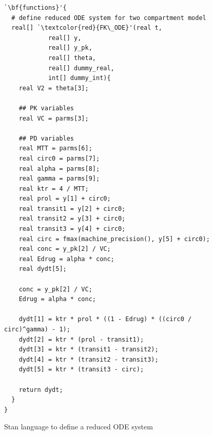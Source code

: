 \documentclass[11pt]{amsart}
\newenvironment{fmpage}[1]
     {\begin{lrbox}{\fmbox}\begin{minipage}{#1}}
     {\end{minipage}\end{lrbox}\fbox{\usebox{\fmbox}}}
\begin{document}
\begin{figure}
\caption{Stan language to define a reduced ODE system}
\begin{center}
\begin{small}
\begin{fmpage}{\textwidth - .75in}
\begin{lstlisting}[basicstyle=\footnotesize\ttfamily,mathescape=true,flexiblecolumns=true,frame=single,escapeinside=`']
`\bf{functions}'{
  # define reduced ODE system for two compartment model
  real[] `\textcolor{red}{FK\_ODE}'(real t,
		    real[] y,
		    real[] y_pk,
		    real[] theta,
		    real[] dummy_real,
		    int[] dummy_int){
    real V2 = theta[3];

    ## PK variables
    real VC = parms[3];

    ## PD variables
    real MTT = parms[6];
    real circ0 = parms[7];
    real alpha = parms[8];
    real gamma = parms[9];
    real ktr = 4 / MTT;
    real prol = y[1] + circ0;
    real transit1 = y[2] + circ0;
    real transit2 = y[3] + circ0;
    real transit3 = y[4] + circ0;
    real circ = fmax(machine_precision(), y[5] + circ0);
    real conc = y_pk[2] / VC;
    real Edrug = alpha * conc;
    real dydt[5];

    conc = y_pk[2] / VC;
    Edrug = alpha * conc;

    dydt[1] = ktr * prol * ((1 - Edrug) * ((circ0 / circ)^gamma) - 1);
    dydt[2] = ktr * (prol - transit1);
    dydt[3] = ktr * (transit1 - transit2);
    dydt[4] = ktr * (transit2 - transit3);
    dydt[5] = ktr * (transit3 - circ);

    return dydt;
  }
}
\end{lstlisting}
\end{fmpage}
\end{small}
\end{center}
\label{FK_reduced}
\end{figure}
\end{document}
